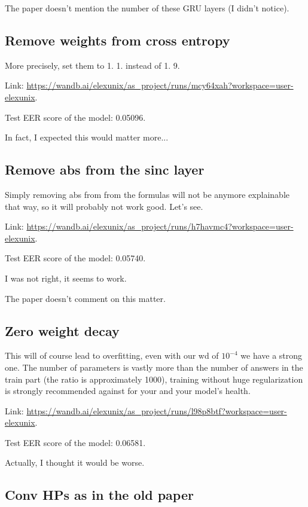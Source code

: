 \documentclass[a4paper]{article}
\begin{document}
The paper doesn't mention the number of these GRU layers (I didn't notice).

\subsection{Remove weights from cross entropy}

More precisely, set them to 1. 1. instead of 1. 9.

Link: \url{https://wandb.ai/elexunix/as_project/runs/mcy64xah?workspace=user-elexunix}.

Test EER score of the model: 0.05096.

In fact, I expected this would matter more...

\subsection{Remove abs from the sinc layer}

Simply removing abs from from the formulas will not be anymore explainable that way, so it will probably not work good. Let's see.

Link: \url{https://wandb.ai/elexunix/as_project/runs/h7havmc4?workspace=user-elexunix}.

Test EER score of the model: 0.05740.

I was not right, it seems to work.

The paper doesn't comment on this matter.

\subsection{Zero weight decay}

This will of course lead to overfitting, even with our wd of $10^{-4}$ we have a strong one. The number of parameters is vastly more than the number of answers in the train part (the ratio is approximately 1000), training without huge regularization is strongly recommended against for your and your model's health.

Link: \url{https://wandb.ai/elexunix/as_project/runs/l98p8btf?workspace=user-elexunix}.

Test EER score of the model: 0.06581.

Actually, I thought it would be worse.

\subsection{Conv HPs as in the old paper}
\end{document}
